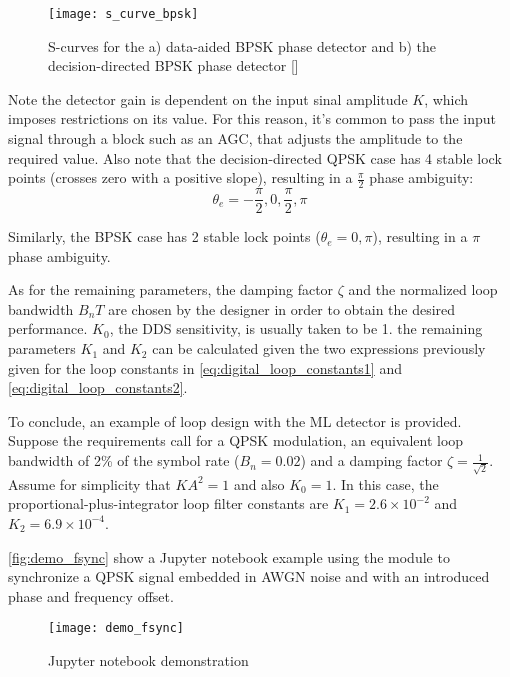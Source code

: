 \begin{figure}[ht]
  \centering
  \texttt{[image: s\_curve\_bpsk]}
  \caption{S-curves for the a) data-aided BPSK phase detector and b) the decision-directed BPSK phase detector [\citeauthor{digcomm_discrete_approach}]}
  \label{fig:s_curve_bpsk}
\end{figure}

Note the detector gain is dependent on the input sinal amplitude $K$, which imposes restrictions on its value. For this reason, it's common to pass the input signal through a block such as an AGC, that adjusts the amplitude to the required value. Also note that the decision-directed QPSK case has 4 stable lock points (crosses zero with a positive slope), resulting in a $\frac{\pi}{2}$ phase ambiguity:
\begin{equation}
  \theta_e=-\frac{\pi}{2},0,\frac{\pi}{2},\pi
\end{equation}

Similarly, the BPSK case has 2 stable lock points ($\theta_e=0,\pi$), resulting in a $\pi$ phase ambiguity.

As for the remaining parameters, the damping factor $\zeta$ and the normalized loop bandwidth $B_nT$ are chosen by the designer in order to obtain the desired performance. $K_0$, the DDS sensitivity, is usually taken to be 1. the remaining parameters $K_1$ and $K_2$ can be calculated given the two expressions previously given for the loop constants in \eqref{eq:digital_loop_constants1} and \eqref{eq:digital_loop_constants2}.

To conclude, an example of loop design with the ML detector is provided. Suppose the requirements call for a QPSK modulation, an equivalent loop bandwidth of 2\% of the symbol rate ($B_n=0.02$) and a damping factor $\zeta=\frac{1}{\sqrt{2}}$. Assume for simplicity that $KA^2=1$ and also $K_0=1$. In this case, the proportional-plus-integrator loop filter constants are $K_1=2.6\times10^{-2}$ and $K_2=6.9\times10^{-4}$.

\autoref{fig:demo_fsync} show a Jupyter notebook example using the  module to synchronize a QPSK signal embedded in AWGN noise and with an introduced phase and frequency offset.

\begin{figure}[ht]
  \centering
  \texttt{[image: demo\_fsync]}
  \caption{ Jupyter notebook demonstration}
  \label{fig:demo_fsync}
\end{figure}

